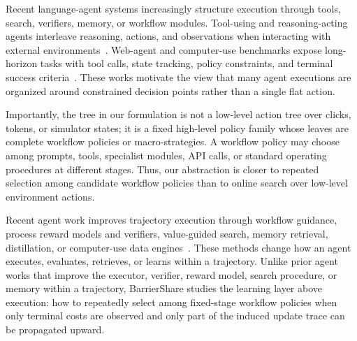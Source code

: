 Recent language-agent systems increasingly structure execution through tools, search, verifiers, memory, or workflow modules.
Tool-using and reasoning-acting agents interleave reasoning, actions, and observations when interacting with external environments~\citep{yao2022react, schick2023toolformer}.
Web-agent and computer-use benchmarks expose long-horizon tasks with tool calls, state tracking, policy constraints, and terminal success criteria~\citep{zhou2023webarena, yao2024tau}.
These works motivate the view that many agent executions are organized around constrained decision points rather than a single flat action.

Importantly, the tree in our formulation is not a low-level action tree over clicks, tokens, or simulator states; it is a fixed high-level policy family whose leaves are complete workflow policies or macro-strategies.
A workflow policy may choose among prompts, tools, specialist modules, API calls, or standard operating procedures at different stages.
Thus, our abstraction is closer to repeated selection among candidate workflow policies than to online search over low-level environment actions.

Recent agent work improves trajectory execution through workflow guidance, process reward models and verifiers, value-guided search, memory retrieval, distillation, or computer-use data engines~\citep{liu2018workflow, chae2025webshepherd, mendes2025selftaught, kang2025agentdistillation, zhang2025gmemory, wang2025opencua}.
These methods change how an agent executes, evaluates, retrieves, or learns within a trajectory.
Unlike prior agent works that improve the executor, verifier, reward model, search procedure, or memory within a trajectory, BarrierShare studies the learning layer above execution: how to repeatedly select among fixed-stage workflow policies when only terminal costs are observed and only part of the induced update trace can be propagated upward.
